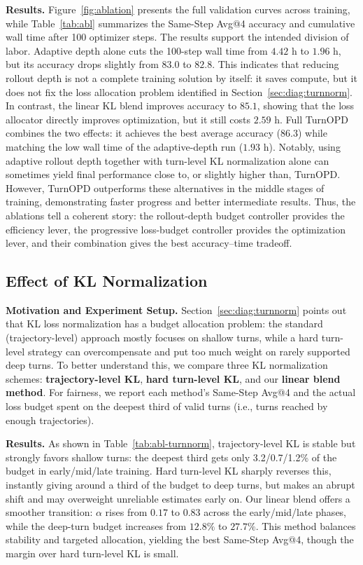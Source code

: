 \textbf{Results.}
Figure~\ref{fig:ablation} presents the full validation curves across training, while Table~\ref{tab:abl} summarizes the Same-Step Avg@4 accuracy and cumulative wall time after 100 optimizer steps.
The results support the intended division of labor. Adaptive depth alone cuts
the 100-step wall time from $4.42$ h to $1.96$ h, but its accuracy drops slightly from
$83.0$ to $82.8$. This indicates that reducing rollout depth is not a complete
training solution by itself: it saves compute, but it does not fix the loss
allocation problem identified in Section~\ref{sec:diag:turnnorm}. In contrast,
the linear KL blend improves accuracy to $85.1$, showing that the loss
allocator directly improves optimization, but it still costs $2.59$ h. 
Full TurnOPD combines the two effects: it achieves the best average accuracy ($86.3$) while matching the low wall time of the adaptive-depth run ($1.93$ h). Notably, using adaptive rollout depth together with turn-level KL normalization alone can sometimes yield final performance close to, or slightly higher than, TurnOPD. However, TurnOPD outperforms these alternatives in the middle stages of training, demonstrating faster progress and better intermediate results. Thus, the ablations tell a coherent story: the rollout-depth budget controller provides the efficiency lever, the progressive loss-budget controller provides the optimization lever, and their combination gives the best accuracy--time tradeoff.

\subsection{Effect of KL Normalization}
\label{sec:exp:kl-normalization}

\textbf{Motivation and Experiment Setup.}
Section~\ref{sec:diag:turnnorm} points out that KL loss normalization has a budget allocation problem: the standard (trajectory-level) approach mostly focuses on shallow turns, while a hard turn-level strategy can overcompensate and put too much weight on rarely supported deep turns. To better understand this, we compare three KL normalization schemes: \textbf{trajectory-level KL}, \textbf{hard turn-level KL}, and our \textbf{linear blend method}. For fairness, we report each method's Same-Step Avg@4 and the actual loss budget spent on the deepest third of valid turns (i.e., turns reached by enough trajectories).

\textbf{Results.}
As shown in Table~\ref{tab:abl-turnnorm}, trajectory-level KL is stable but strongly favors shallow turns: the deepest third gets only 3.2/0.7/1.2\% of the budget in early/mid/late training. Hard turn-level KL sharply reverses this, instantly giving around a third of the budget to deep turns, but makes an abrupt shift and may overweight unreliable estimates early on. Our linear blend offers a smoother transition: $\alpha$ rises from $0.17$ to $0.83$ across the early/mid/late phases, while the deep-turn budget increases from $12.8\%$ to $27.7\%$. This method balances stability and targeted allocation, yielding the best Same-Step Avg@4, though the margin over hard turn-level KL is small.

